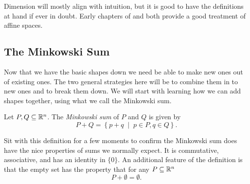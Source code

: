 \documentclass[12pt,oneside]{../../sfsuthesis}
\begin{document}
Dimension will mostly align with intuition, but it is good to have the definitions at hand if ever in doubt.
Early chapters of \cite{zieglerLecturesPolytopes1995} and \cite{grunbaumConvexPolytopes2003} both provide a good treatment of affine spaces.

\subsection{The Minkowski Sum}
Now that we have the basic shapes down we need be able to make new ones out of existing ones.
The two general strategies here will be to combine them in to new ones and to break them down.
We will start with learning how we can add shapes together, using what we call the Minkowski sum.
\begin{definition}\th\label{def:MinkowskiSum}
    Let \( P, Q \subseteq \mathbb{R}^n \).
    The \emph{Minkowski sum} of \( P \) and \( Q \) is given by
    \[
        P + Q = \left\{ p + q \; \middle| \; p \in P, q \in Q \right\}.
    \]
\end{definition}
Sit with this definition for a few moments to confirm the Minkowski sum does have the nice properties of sums we normally expect.
It is commutative, associative, and has an identity in \( \{ 0 \} \).
An additional feature of the definition is that the empty set has the property that for any \( P \subseteq \mathbb{R}^n \)
\[
    P + \emptyset = \emptyset.
\]
\end{document}
